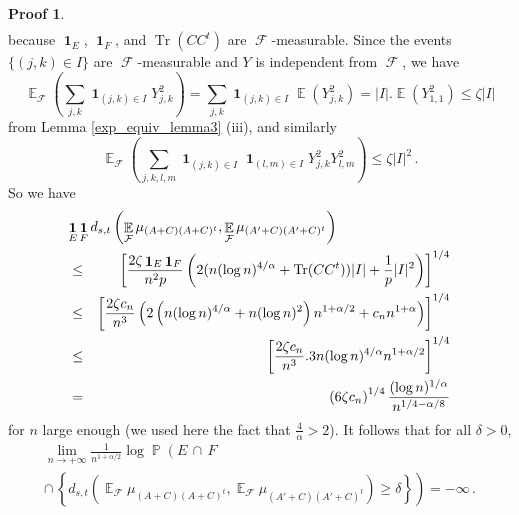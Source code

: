 \documentclass[11pt,a4paper]{article}
\DeclareMathOperator{\E}{\mathbb{E}}
\DeclareMathOperator{\PR}{\mathbb{P}}
\DeclareMathOperator{\FF}{\mathcal{F}}
\DeclareMathOperator{\1}{\mathbf{1}}
\DeclareMathOperator{\Tr}{\mathrm{Tr}}
\theoremstyle{definition}
\newtheorem*{Proof}{Proof}
\begin{document}
\begin{Proof}
\begin{eqnarray*}
\end{eqnarray*}
because $\1_E$, $\1_F$, and $\Tr(CC^t)$ are $\FF$-measurable. Since the events $\{(j,k) \in I\}$ are $\FF$-measurable and $Y$ is independent from $\FF$, we have
\begin{displaymath}
\E_{\FF} \left( \sum_{j,k} \1_{(j,k) \in I} Y_{j,k}^2 \right) = \sum_{j,k} \1_{(j,k) \in I} \E(Y_{j,k}^2) = |I|.\E(Y_{1,1}^2) \le \zeta |I|
\end{displaymath}
from Lemma \ref{exp_equiv_lemma3} (iii), and similarly
\begin{displaymath}
\E_{\FF} \left( \sum_{j,k,l,m} \1_{(j,k) \in I} \1_{(l,m) \in I} Y_{j,k}^2 Y_{l,m}^2 \right) \le \zeta |I|^2 \, .
\end{displaymath}
So we have
\begin{eqnarray*}
\lefteqn{  \1_E \1_F d_{s,t} \left( \E_{\FF} \mu_{(A+C)(A+C)^t} , \E_{\FF} \mu_{(A'+C)(A'+C)^t} \right)  } \\
& \le & \left[ \frac{2 \zeta \1_E \1_F}{n^2p} \left( 2(n(\log n)^{4/\alpha} + \Tr(CC^t)) |I| + \frac1p |I|^2 \right) \right]^{1/4} \\
& \le & \left[ \frac{2 \zeta c_n}{n^3} \left( 2 \left( n (\log n)^{4/\alpha} + n (\log n)^2 \right) n^{1+\alpha/2} + c_n n^{1+\alpha} \right) \right]^{1/4} \\
& \le & \left[ \frac{2 \zeta c_n}{n^3} . 3n (\log n)^{4/\alpha} n^{1+\alpha/2} \right]^{1/4} \\
& = & \left( 6 \zeta c_n \right)^{1/4} \frac{(\log n)^{1/\alpha}}{n^{1/4-\alpha/8}}
\end{eqnarray*}
for $n$ large enough (we used here the fact that $\frac{4}{\alpha}>2$). It follows that for all $\delta>0$,
\begin{multline} \label{exp_equiv_eq6}
\lim_{n \to +\infty} \frac{1}{n^{1+\alpha/2}} \log \PR \left( E \, \cap \, F \, \right. \\
\left. \cap \, \left\{ d_{s,t} \left( \E_{\FF} \mu_{(A+C)(A+C)^t} , \E_{\FF} \mu_{(A'+C)(A'+C)^t} \right) \ge \delta \right\} \right) = -\infty \, .
\end{multline}


\end{Proof}
\end{document}
